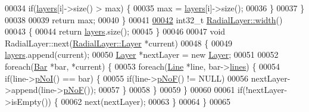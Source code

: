 \begin{DoxyCode}
00034     \textcolor{keywordflow}{if}(\hyperlink{class_radial_layer_a714c36b1ab50a7778953e924ddac2787}{layers}[i]->size() > max) \{
00035       max = \hyperlink{class_radial_layer_a714c36b1ab50a7778953e924ddac2787}{layers}[i]->size();
00036     \}
00037   \}
00038 
00039   \textcolor{keywordflow}{return} max;
00040 \}
00041 
\hypertarget{radiallayer_8cpp_source_l00042}{}\hyperlink{class_radial_layer_ae8b32d0711cc6f4dbec832bb07d59a49}{00042} int32\_t \hyperlink{class_radial_layer_ae8b32d0711cc6f4dbec832bb07d59a49}{RadialLayer::width}()
00043 \{
00044   \textcolor{keywordflow}{return} \hyperlink{class_radial_layer_a714c36b1ab50a7778953e924ddac2787}{layers}.size();
00045 \}
00046 
00047 \textcolor{keywordtype}{void} RadialLayer::next(\hyperlink{class_radial_layer_a65d67f20b05dd45f90ec4252376807b2}{RadialLayer::Layer} *current)
00048 \{
00049   \hyperlink{class_radial_layer_a714c36b1ab50a7778953e924ddac2787}{layers}.append(current);
00050   \hyperlink{class_radial_layer_a65d67f20b05dd45f90ec4252376807b2}{Layer} *nextLayer = \textcolor{keyword}{new} \hyperlink{class_radial_layer_a65d67f20b05dd45f90ec4252376807b2}{Layer};
00051 
00052   \textcolor{keywordflow}{foreach}(\hyperlink{class_bar}{Bar} *bar, *current) \{
00053     \textcolor{keywordflow}{foreach}(\hyperlink{class_line}{Line} *line, bar->\hyperlink{class_bar_a5aabf1f4ac22e20e9cb702a3a7e08eea}{lines}) \{
00054       \textcolor{keywordflow}{if}(line->\hyperlink{group___models_gaeafd90e84ac2f8de2a879abe9e53eef3}{pNoI}() == bar) \{
00055         \textcolor{keywordflow}{if}(line->\hyperlink{group___models_gabbc73ddedd3075c33ae5331bd7c9829f}{pNoF}() != NULL)
00056           nextLayer->append(line->\hyperlink{group___models_gabbc73ddedd3075c33ae5331bd7c9829f}{pNoF}());
00057       \}
00058     \}
00059   \}
00060 
00061   \textcolor{keywordflow}{if}(!nextLayer->isEmpty()) \{
00062     next(nextLayer);
00063   \}
00064 \}
00065 
\end{DoxyCode}

